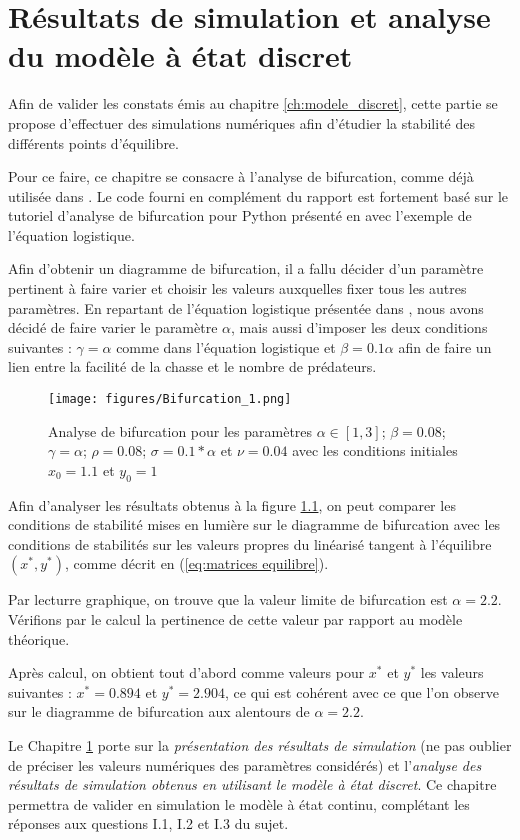 \chapter{Résultats de simulation et analyse du modèle à état discret}
\label{ch:simu}

Afin de valider les constats émis au chapitre \ref{ch:modele_discret}, cette partie se propose d'effectuer des simulations numériques afin d'étudier la stabilité des différents points d'équilibre.

Pour ce faire, ce chapitre se consacre à l'analyse de bifurcation, comme déjà utilisée dans \cite{ChaosControl}. Le code fourni en complément du rapport est fortement basé sur le tutoriel d'analyse de bifurcation pour Python présenté en \cite{bifurc} avec l'exemple de l'équation logistique.

Afin d'obtenir un diagramme de bifurcation, il a fallu décider d'un paramètre pertinent à faire varier et choisir les valeurs auxquelles fixer tous les autres paramètres. En repartant de l'équation logistique présentée dans \cite{bifurc}, nous avons décidé de faire varier le paramètre $\alpha$, mais aussi d'imposer les deux conditions suivantes : $\gamma = \alpha$ comme dans l'équation logistique et $\beta = 0.1 \alpha$ afin de faire un lien entre la facilité de la chasse et le nombre de prédateurs.

\begin{figure}
    \begin{center}
		\texttt{[image: figures/Bifurcation\_1.png]}
	\end{center}
	\caption{Analyse de bifurcation pour les paramètres $\alpha \in [1, 3]$; $\beta = 0.08$; $\gamma = \alpha$; $\rho = 0.08$; $\sigma = 0.1*\alpha$ et $\nu = 0.04$ avec les conditions initiales $x_0 = 1.1$ et $y_0 = 1$}
    \label{fig:bifurc}
\end{figure}

Afin d'analyser les résultats obtenus à la figure \ref{fig:bifurc}, on peut comparer les conditions de stabilité mises en lumière sur le diagramme de bifurcation avec les conditions de stabilités sur les valeurs propres du linéarisé tangent à l'équilibre $(x^*, y^*)$, comme décrit en (\ref{eq:matrices equilibre}).

Par lecturre graphique, on trouve que la valeur limite de bifurcation est $\alpha = 2.2$. Vérifions par le calcul la pertinence de cette valeur par rapport au modèle théorique.

Après calcul, on obtient tout d'abord comme valeurs pour $x^*$ et $y^*$ les valeurs suivantes : $x^* = 0.894$ et $y^* = 2.904$, ce qui est cohérent avec ce que l'on observe sur le diagramme de bifurcation aux alentours de $\alpha = 2.2$.



Le Chapitre \ref{ch:simu} porte sur la \textit{présentation des résultats de simulation} (ne pas oublier de préciser les valeurs numériques des paramètres considérés) et l’\textit{analyse des résultats de simulation obtenus en utilisant le modèle à état discret}.
Ce chapitre permettra de valider en simulation le modèle à état continu, complétant les réponses aux questions I.1, I.2 et I.3 du sujet.
